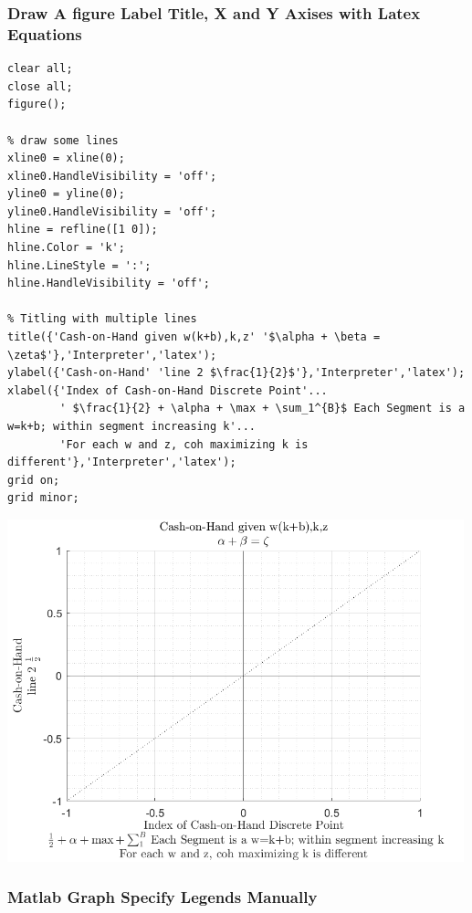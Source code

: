 \documentclass[
]{book}
\begin{document}
\hypertarget{draw-a-figure-label-title-x-and-y-axises-with-latex-equations}{%
\subsubsection{\texorpdfstring{\textbf{Draw A figure Label Title, X and Y Axises with Latex Equations}}{Draw A figure Label Title, X and Y Axises with Latex Equations}}\label{draw-a-figure-label-title-x-and-y-axises-with-latex-equations}}

\begin{verbatim}
clear all;
close all;
figure();

% draw some lines
xline0 = xline(0);
xline0.HandleVisibility = 'off';
yline0 = yline(0);
yline0.HandleVisibility = 'off';
hline = refline([1 0]);
hline.Color = 'k';
hline.LineStyle = ':';
hline.HandleVisibility = 'off';

% Titling with multiple lines
title({'Cash-on-Hand given w(k+b),k,z' '$\alpha + \beta = \zeta$'},'Interpreter','latex');
ylabel({'Cash-on-Hand' 'line 2 $\frac{1}{2}$'},'Interpreter','latex');
xlabel({'Index of Cash-on-Hand Discrete Point'...
        ' $\frac{1}{2} + \alpha + \max + \sum_1^{B}$ Each Segment is a w=k+b; within segment increasing k'...
        'For each w and z, coh maximizing k is different'},'Interpreter','latex');
grid on;
grid minor;
\end{verbatim}

\includegraphics[width=5.20833in,height=\textheight]{img/fs_titling_images/figure_0.png}

\hypertarget{matlab-graph-specify-legends-manually}{%
\subsubsection{Matlab Graph Specify Legends Manually}\label{matlab-graph-specify-legends-manually}}
\end{document}
